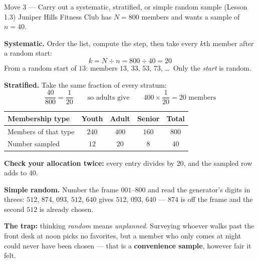 \documentclass[10pt]{article}
\begin{document}
\vspace{3pt}
\boxguard[16]
\begin{notesbox}{Move 3 --- Carry out a systematic, stratified, or simple random sample (Lesson 1.3)}
\small
Juniper Hills Fitness Club has $N = 800$ members and wants a sample of $n = 40$.

\vspace{2pt}
\textbf{Systematic.} Order the list, compute the step, then take every $k$th member after a
random start:
\[ k = N \div n = 800 \div 40 = 20 \]
From a random start of $13$: members $13$, $33$, $53$, $73$, \dots\ Only the \emph{start} is
random.

\vspace{3pt}
\textbf{Stratified.} Take the same fraction of every stratum:
\[ \frac{40}{800} = \frac{1}{20} \qquad\text{so adults give}\qquad
   400 \times \frac{1}{20} = 20 \text{ members} \]

\vspace{-2pt}
\renewcommand{\arraystretch}{1.2}
\begin{tabularx}{\linewidth}{@{} X c c c | c @{}}
\rowcolor{frost}
\textbf{Membership type} & \textbf{Youth} & \textbf{Adult} & \textbf{Senior} & \textbf{Total} \\
\midrule
Members of that type & $240$ & $400$ & $160$ & $800$ \\
Number sampled & $12$ & $20$ & $8$ & $40$ \\
\end{tabularx}

\vspace{3pt}
\textbf{Check your allocation twice:} every entry divides by $20$, and the sampled row adds to
$40$.

\vspace{3pt}
\textbf{Simple random.} Number the frame $001$--$800$ and read the generator's digits in
threes: $512$, $874$, $093$, $512$, $640$ gives $512$, $093$, $640$ --- $874$ is off the frame
and the second $512$ is already chosen.

\vspace{3pt}
\textbf{The trap:} thinking \emph{random} means \emph{unplanned}. Surveying whoever walks past
the front desk at noon picks no favorites, but a member who only comes at night could never
have been chosen --- that is a \textbf{convenience sample}, however fair it felt.
\end{notesbox}
\end{document}
